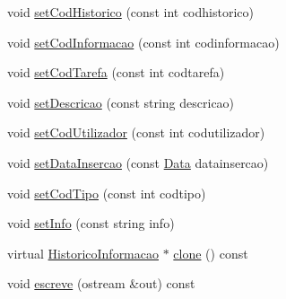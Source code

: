\begin{DoxyCompactItemize}
\item 
void \hyperlink{class_historico_informacao_a5f66c2777c96b7b3a137dad00c7fd6cc}{set\-Cod\-Historico} (const int codhistorico)
\item 
void \hyperlink{class_historico_informacao_ab340c5857a479803306377d52ed4f99e}{set\-Cod\-Informacao} (const int codinformacao)
\item 
void \hyperlink{class_historico_informacao_a3e946803ee33c2cb633a7e1c2122c5af}{set\-Cod\-Tarefa} (const int codtarefa)
\item 
void \hyperlink{class_historico_informacao_ad33f81c4fa8605dadf217f921a4fcacf}{set\-Descricao} (const string descricao)
\item 
void \hyperlink{class_historico_informacao_aeda6de3c11d18c67098b475b1c7d3569}{set\-Cod\-Utilizador} (const int codutilizador)
\item 
void \hyperlink{class_historico_informacao_a74d06fe28b13061381923f7da8c0a6ac}{set\-Data\-Insercao} (const \hyperlink{class_data}{Data} datainsercao)
\item 
void \hyperlink{class_historico_informacao_a68f2ea7a9808d72252873620c25a157e}{set\-Cod\-Tipo} (const int codtipo)
\item 
void \hyperlink{class_historico_informacao_a48d2edfe4f50092d1fc66ef24fd361d8}{set\-Info} (const string info)
\item 
virtual \hyperlink{class_historico_informacao}{Historico\-Informacao} $\ast$ \hyperlink{class_historico_informacao_afad9f99455453aaf4676302b0254cdec}{clone} () const 
\item 
void \hyperlink{class_historico_informacao_a68d9c661f3db1c862cdcbde6fff68dcf}{escreve} (ostream \&out) const 
\end{DoxyCompactItemize}


